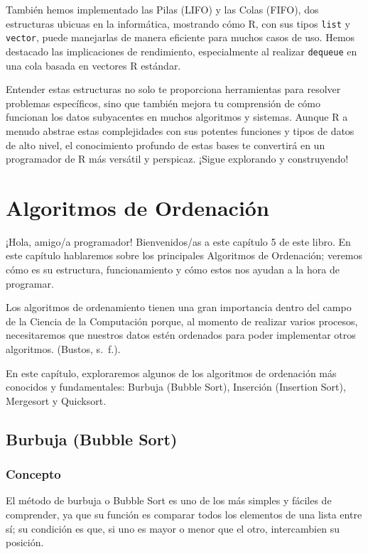 \documentclass[
  spanish,
  letterpaper,
  DIV=11,
  numbers=noendperiod]{scrreprt}
\begin{document}
También hemos implementado las Pilas (LIFO) y las Colas (FIFO), dos
estructuras ubicuas en la informática, mostrando cómo R, con sus tipos
\texttt{list} y \texttt{vector}, puede manejarlas de manera eficiente
para muchos casos de uso. Hemos destacado las implicaciones de
rendimiento, especialmente al realizar \texttt{dequeue} en una cola
basada en vectores R estándar.

Entender estas estructuras no solo te proporciona herramientas para
resolver problemas específicos, sino que también mejora tu comprensión
de cómo funcionan los datos subyacentes en muchos algoritmos y sistemas.
Aunque R a menudo abstrae estas complejidades con sus potentes funciones
y tipos de datos de alto nivel, el conocimiento profundo de estas bases
te convertirá en un programador de R más versátil y perspicaz. ¡Sigue
explorando y construyendo!


\chapter{Algoritmos de Ordenación}\label{algoritmos-de-ordenaciuxf3n}

¡Hola, amigo/a programador! Bienvenidos/as a este capítulo 5 de este
libro. En este capítulo hablaremos sobre los principales Algoritmos de
Ordenación; veremos cómo es su estructura, funcionamiento y cómo estos
nos ayudan a la hora de programar.

Los algoritmos de ordenamiento tienen una gran importancia dentro del
campo de la Ciencia de la Computación porque, al momento de realizar
varios procesos, necesitaremos que nuestros datos estén ordenados para
poder implementar otros algoritmos. (Bustos, s.~f.).

En este capítulo, exploraremos algunos de los algoritmos de ordenación
más conocidos y fundamentales: Burbuja (Bubble Sort), Inserción
(Insertion Sort), Mergesort y Quicksort.

\section{Burbuja (Bubble Sort)}\label{burbuja-bubble-sort}

\subsection{Concepto}\label{concepto}

El método de burbuja o Bubble Sort es uno de los más simples y fáciles
de comprender, ya que su función es comparar todos los elementos de una
lista entre sí; su condición es que, si uno es mayor o menor que el
otro, intercambien su posición.
\end{document}
